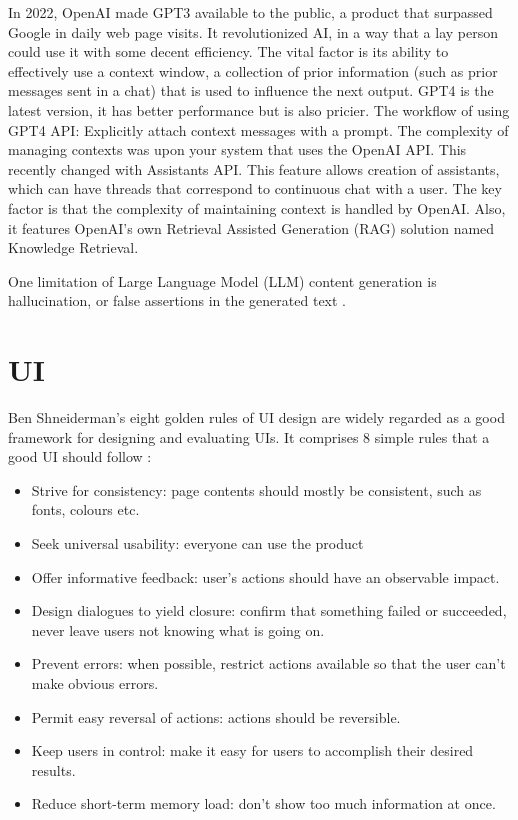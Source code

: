  In 2022, OpenAI made GPT3 available to the public, a product that surpassed Google in daily web page visits. It revolutionized AI, in a way that a lay person could use it with some decent efficiency. The vital factor is its ability to effectively use a context window, a collection of prior information (such as prior messages sent in a chat) that is used to influence the next output. GPT4 is the latest version, it has better performance but is also pricier. The workflow of using GPT4 API: Explicitly attach context messages with a prompt. The complexity of managing contexts was upon your system that uses the OpenAI API. This recently changed with Assistants API. This feature allows creation of assistants, which can have threads that correspond to continuous chat with a user. The key factor is that the complexity of maintaining context is handled by OpenAI. Also, it features OpenAI's own Retrieval Assisted Generation (RAG) solution named Knowledge Retrieval. 

 One limitation of Large Language Model (LLM) content generation is hallucination, or false assertions in the generated text \cite{ji2023survey}.

\section{UI}
\label{section:goldenRules}
Ben Shneiderman's eight golden rules of UI design are widely regarded as a good framework for designing and evaluating UIs. It comprises 8 simple rules that a good UI should follow \cite{goldenRulesUI}: \begin{itemize}
    \item Strive for consistency: page contents should mostly be consistent, such as fonts, colours etc. 
    \item Seek universal usability: everyone can use the product
    \item Offer informative feedback: user's actions should have an observable impact.
    \item Design dialogues to yield closure: confirm that something failed or succeeded, never leave users not knowing what is going on.
    \item Prevent errors: when possible, restrict actions available so that the user can't make obvious errors.
    \item Permit easy reversal of actions: actions should be reversible.
    \item Keep users in control: make it easy for users to accomplish their desired results.
    \item Reduce short-term memory load: don't show too much information at once.
\end{itemize}

